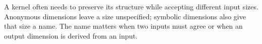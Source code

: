 A kernel often needs to preserve its structure while accepting different input sizes. Anonymous dimensions leave a size unspecified; symbolic dimensions also give that size a name. The name matters when two inputs must agree or when an output dimension is derived from an input.
